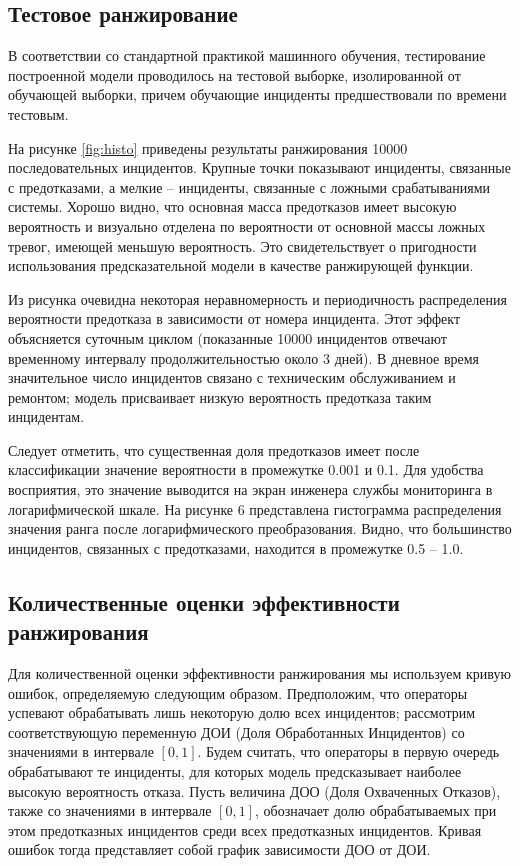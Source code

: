 \subsection{Тестовое ранжирование}

В соответствии со стандартной практикой машинного обучения, тестирование построенной модели проводилось на тестовой выборке, изолированной от обучающей выборки, причем обучающие инциденты предшествовали по времени тестовым.

На рисунке \ref{fig:histo} приведены результаты ранжирования 10000 последовательных инцидентов. Крупные точки показывают инциденты, связанные с предотказами, а мелкие -- инциденты, связанные с ложными срабатываниями системы. Хорошо видно, что основная масса предотказов имеет высокую вероятность и визуально отделена по вероятности от основной массы ложных тревог, имеющей меньшую вероятность. Это свидетельствует о пригодности использования предсказательной модели в качестве ранжирующей функции.

Из рисунка очевидна некоторая неравномерность и периодичность распределения вероятности предотказа в зависимости от номера инцидента. Этот эффект объясняется суточным циклом (показанные 10000 инцидентов отвечают временному интервалу продолжительностью около 3 дней). В дневное время значительное число инцидентов связано с техническим обслуживанием и ремонтом; модель присваивает низкую вероятность предотказа таким инцидентам.


Следует отметить, что существенная доля предотказов имеет после классификации значение вероятности в промежутке 0.001 и 0.1. Для удобства восприятия, это значение выводится на экран инженера службы мониторинга в логарифмической шкале. На рисунке 6 представлена гистограмма распределения значения ранга после логарифмического преобразования. Видно, что большинство инцидентов, связанных с предотказами, находится в промежутке 0.5 – 1.0.

\subsection{Количественные оценки эффективности ранжирования}
Для количественной оценки эффективности ранжирования мы используем кривую ошибок, определяемую следующим образом. Предположим, что операторы успевают обрабатывать лишь некоторую долю всех инцидентов; рассмотрим соответствующую переменную ДОИ (Доля Обработанных Инцидентов) со значениями в интервале $[0,1]$. Будем считать, что операторы в первую очередь обрабатывают те инциденты, для которых модель предсказывает наиболее высокую вероятность отказа. Пусть величина ДОО (Доля Охваченных Отказов), также со значениями в интервале $[0,1]$, обозначает долю обрабатываемых при этом предотказных инцидентов среди всех предотказных инцидентов. Кривая ошибок тогда представляет собой график зависимости ДОО от ДОИ.


